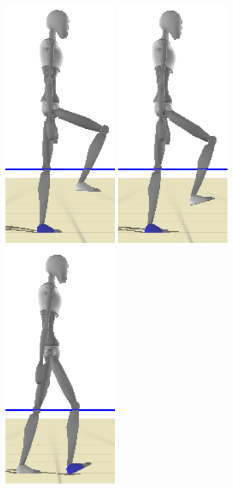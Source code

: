 \documentclass[runningheads,a4paper,10pt]{llncs}
\begin{document}
\begin{figure}[t]
\begin{minipage}{0.4\columnwidth}
\includegraphics[width=0.101\columnwidth]{images/strips/0_5/6.png}
\includegraphics[width=0.101\columnwidth]{images/strips/0_5/7.png}
\includegraphics[width=0.101\columnwidth]{images/strips/0_5/8.png}


\end{minipage}
\end{figure}
\end{document}
